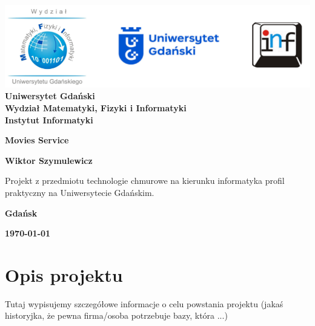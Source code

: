 \documentclass[12pt,a4paper]{article}
\newcommand{\hmwkTitle}{Movies Service} %
\newcommand{\hmwkDueDate}{\today} %
\newcommand{\hmwkAuthorName}{Wiktor Szymulewicz} %
\begin{document}
\begin{titlepage}
    \vfill
	\begin{center}
	\hspace*{-1cm}
	\vspace*{0.5cm}
    \includegraphics[scale=0.55]{imagens/loga.png}\\
	\textbf{Uniwersytet Gdański \\ [0.05cm]Wydział Matematyki, Fizyki i Informatyki \\ [0.05cm] Instytut Informatyki}

	\vspace{0.6cm}
	\vspace{4cm}
	{\huge \textbf{\hmwkTitle}}\vspace{8mm}
	
	{\large \textbf{\hmwkAuthorName}}\\[3cm]
	
		\hspace{.45\textwidth} %
	   \begin{minipage}{.5\textwidth}
	   Projekt z przedmiotu technologie chmurowe na kierunku informatyka profil praktyczny na Uniwersytecie Gdańskim.\\[0.1cm]
	  \end{minipage}
	  \vfill
	
	\textbf{Gdańsk}
	
	\textbf{\hmwkDueDate}
	\end{center}
	
\end{titlepage}

\newpage
\setcounter{secnumdepth}{5}
\tableofcontents
\newpage

\section{Opis projektu}
\label{sec:Project}

Tutaj wypisujemy szczegółowe informacje o celu powstania projektu (jakaś historyjka, że pewna firma/osoba potrzebuje bazy, która ...)
\end{document}
